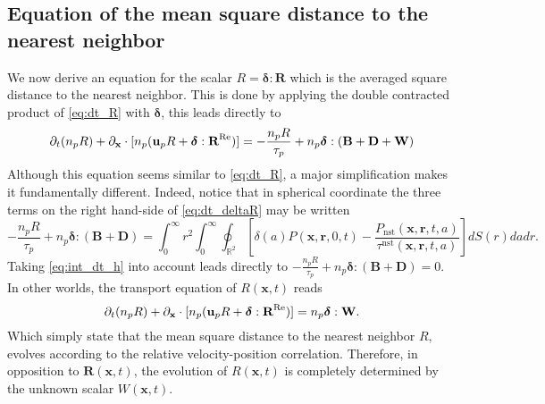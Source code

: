 \subsection{Equation of the mean square distance to the nearest neighbor}

We now derive an equation for the scalar $R = \bm\delta : \textbf{R}$ which is the averaged square distance to the nearest neighbor. 
This is done by applying the double contracted product of \ref{eq:dt_R} with $\bm\delta$, this leads directly to 
\begin{equation}
    \partial_t (n_pR)
    + {\partial_\textbf{x}} \cdot [n_p(\textbf{u}_pR
    + \bm\delta :\textbf{R}^\text{Re})]
    = 
    - \frac{n_pR}{\tau_p}
    +n_p  \bm\delta : (\textbf{B}+\textbf{D}+\textbf{W})
    \label{eq:dt_deltaR}
\end{equation}
Although this equation seems similar to \ref{eq:dt_R}, a major simplification makes it fundamentally different. 
Indeed, notice that in spherical coordinate the three terms on the right hand-side of \ref{eq:dt_deltaR} may be written
\begin{equation*}
    - \frac{n_pR}{\tau_p}
    + n_p  \bm\delta : (\textbf{B}+\textbf{D})
    = 
    \int_0^\infty r^2 \int_{0}^{\infty}\oint_{\mathbb{R}^2}\left[
        \delta(a)P(\textbf{x},\textbf{r},0,t)
    - \frac{P_\text{nst}(\textbf{x},\textbf{r},t,a)}{\tau^\text{nst}(\textbf{x},\textbf{r},t,a)}
    \right]dS(r) da dr.
\end{equation*}
Taking \ref{eq:int_dt_h} into account leads directly to $- \frac{n_pR}{\tau_p} + n_p  \bm\delta : (\textbf{B}+\textbf{D}) = 0$. 
In other worlds, the transport equation of $R(\textbf{x},t)$ reads 
\begin{equation}
    \partial_t (n_pR)
    + {\partial_\textbf{x}} \cdot [n_p(\textbf{u}_pR
    + \bm\delta : \textbf{R}^\text{Re})]
    = 
    n_p\bm\delta : \textbf{W}. 
    \label{eq:dt_deltaR2}
\end{equation}
Which simply state that the mean square distance to the nearest neighbor $R$, evolves according to the relative velocity-position correlation.
Therefore, in opposition to $\textbf{R}(\textbf{x},t)$, the evolution of $R(\textbf{x},t)$ is completely determined by the unknown scalar $W(\textbf{x},t)$. 


